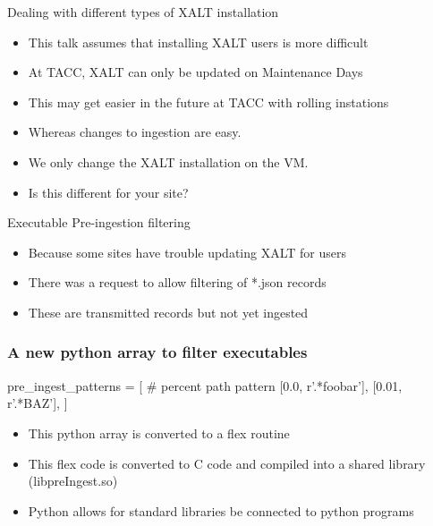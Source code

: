 \documentclass{beamer}
\begin{document}
\begin{frame}{Dealing with different types of XALT installation}
  \begin{itemize}
    \item This talk assumes that installing XALT users is more
      difficult
    \item At TACC, XALT can only be updated on Maintenance Days 
    \item This may get easier in the future at TACC with rolling instations
    \item Whereas changes to ingestion are easy.
    \item We only change the XALT installation on the VM.
    \item Is this different for your site?
  \end{itemize}
\end{frame}

\begin{frame}{Executable Pre-ingestion filtering}
  \begin{itemize}
    \item Because some sites have trouble updating XALT for users
    \item There was a request to allow filtering of *.json records 
    \item These are transmitted records but not yet ingested
  \end{itemize}
\end{frame}

\begin{frame}[fragile]
    \frametitle{A new python array to filter executables}
 {\small
    \begin{semiverbatim}
pre_ingest_patterns = [
#   percent   path pattern
    [0.0,     r'.*\/foobar'],
    [0.01,    r'.*\/BAZ'],
]
    \end{semiverbatim}
 }
  \begin{itemize}
    \item This python array is converted to a flex routine
    \item This flex code is converted to C code and compiled into a
      shared library (libpreIngest.so)
    \item Python allows for standard libraries be connected to python programs
  \end{itemize}
\end{frame}
\end{document}
